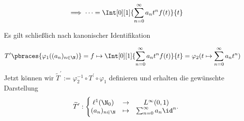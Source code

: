\begin{solution}
\begin{align*}
  \implies
  \cdots
  =
  \Int[0][1]{\sum_{n=0}^\infty a_n t^n f(t)}{t}
\end{align*}

Es gilt schließlich nach kanonischer Identifikation

\begin{align*}
T^\prime \pbraces
{
  \varphi_1((a_n)_{n \in \N})
}
& = f \mapsto \Int[0][1]{\sum_{n=0}^\infty a_n t^n f(t)}{t}
= \varphi_2(t \mapsto \sum_{n=0}^\infty a_n t^n)
\end{align*}
Jetzt können wir $\widetilde{T}^{\prime} := \varphi_2^{-1} \circ T^{\prime}\circ \varphi_1$ definieren
und erhalten die gewünschte Darstellung
\begin{align*}
  \widetilde{T}^{\prime}:
  \Bigg\{ \begin{matrix}
    \ell^1(\N_0) & \to  & L^\infty(0, 1) \\
    (a_n)_{n \in \N} & \mapsto & \sum_{n=0}^\infty a_n \id^n
    \end{matrix}.
\end{align*}
\end{solution}
